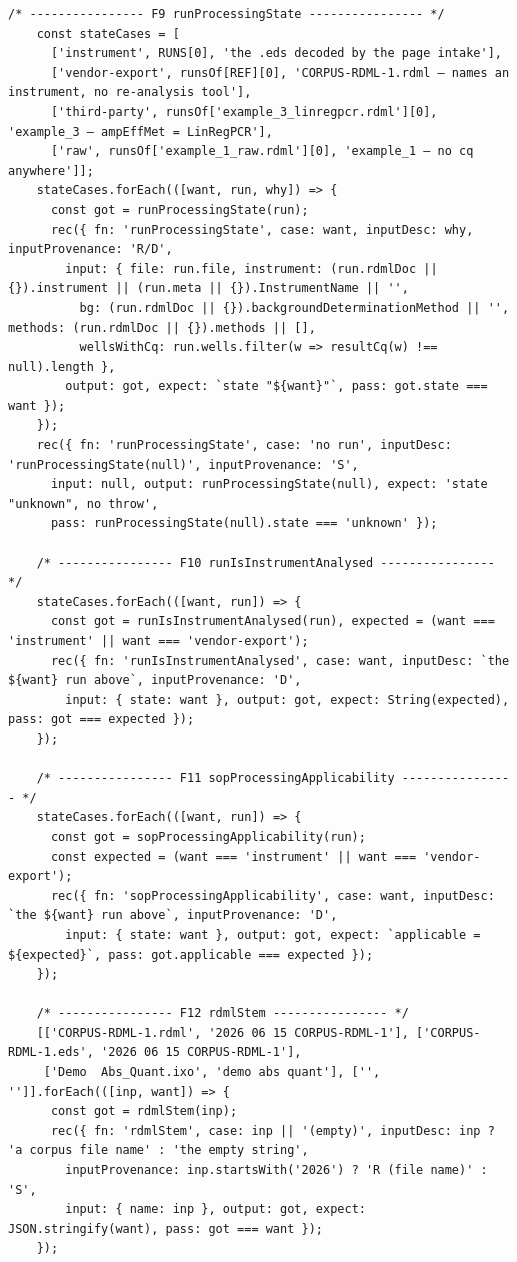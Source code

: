 \begin{lstlisting}[style=js]
    /* ---------------- F9 runProcessingState ---------------- */
    const stateCases = [
      ['instrument', RUNS[0], 'the .eds decoded by the page intake'],
      ['vendor-export', runsOf[REF][0], 'CORPUS-RDML-1.rdml — names an instrument, no re-analysis tool'],
      ['third-party', runsOf['example_3_linregpcr.rdml'][0], 'example_3 — ampEffMet = LinRegPCR'],
      ['raw', runsOf['example_1_raw.rdml'][0], 'example_1 — no cq anywhere']];
    stateCases.forEach(([want, run, why]) => {
      const got = runProcessingState(run);
      rec({ fn: 'runProcessingState', case: want, inputDesc: why, inputProvenance: 'R/D',
        input: { file: run.file, instrument: (run.rdmlDoc || {}).instrument || (run.meta || {}).InstrumentName || '',
          bg: (run.rdmlDoc || {}).backgroundDeterminationMethod || '', methods: (run.rdmlDoc || {}).methods || [],
          wellsWithCq: run.wells.filter(w => resultCq(w) !== null).length },
        output: got, expect: `state "${want}"`, pass: got.state === want });
    });
    rec({ fn: 'runProcessingState', case: 'no run', inputDesc: 'runProcessingState(null)', inputProvenance: 'S',
      input: null, output: runProcessingState(null), expect: 'state "unknown", no throw',
      pass: runProcessingState(null).state === 'unknown' });

    /* ---------------- F10 runIsInstrumentAnalysed ---------------- */
    stateCases.forEach(([want, run]) => {
      const got = runIsInstrumentAnalysed(run), expected = (want === 'instrument' || want === 'vendor-export');
      rec({ fn: 'runIsInstrumentAnalysed', case: want, inputDesc: `the ${want} run above`, inputProvenance: 'D',
        input: { state: want }, output: got, expect: String(expected), pass: got === expected });
    });

    /* ---------------- F11 sopProcessingApplicability ---------------- */
    stateCases.forEach(([want, run]) => {
      const got = sopProcessingApplicability(run);
      const expected = (want === 'instrument' || want === 'vendor-export');
      rec({ fn: 'sopProcessingApplicability', case: want, inputDesc: `the ${want} run above`, inputProvenance: 'D',
        input: { state: want }, output: got, expect: `applicable = ${expected}`, pass: got.applicable === expected });
    });

    /* ---------------- F12 rdmlStem ---------------- */
    [['CORPUS-RDML-1.rdml', '2026 06 15 CORPUS-RDML-1'], ['CORPUS-RDML-1.eds', '2026 06 15 CORPUS-RDML-1'],
     ['Demo  Abs_Quant.ixo', 'demo abs quant'], ['', '']].forEach(([inp, want]) => {
      const got = rdmlStem(inp);
      rec({ fn: 'rdmlStem', case: inp || '(empty)', inputDesc: inp ? 'a corpus file name' : 'the empty string',
        inputProvenance: inp.startsWith('2026') ? 'R (file name)' : 'S',
        input: { name: inp }, output: got, expect: JSON.stringify(want), pass: got === want });
    });


\end{lstlisting}
